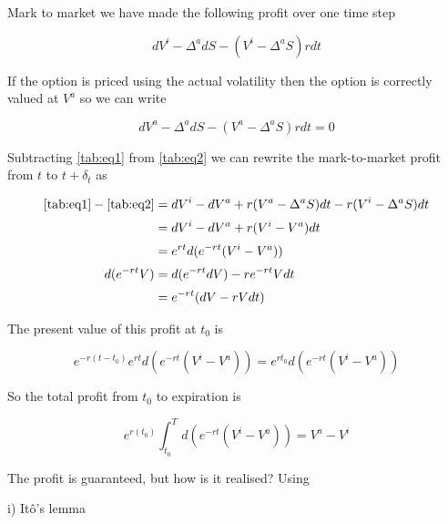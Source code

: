 \documentclass{article}
\newcommand{\para}{\vspace{8pt}} %
\begin{document}
Mark to market we have made the following profit over one time step

\begin{center}
\begin{equation}
    dV^i - \Delta^a dS -(V^i - \Delta^a S) rdt
    \label{tab:eq1}
\end{equation}
\end{center}
If the option is priced using the actual volatility then the option is correctly valued at $V^a$ so we can write
\begin{center}
\begin{equation}
    dV^a - \Delta^a dS -(V^a - \Delta^a S) rdt = 0 
    \label{tab:eq2}
\end{equation}
\end{center}
Subtracting \ref{tab:eq1} from \ref{tab:eq2} we can rewrite the mark-to-market profit from $t$ to $t + \delta_t$ as

\begin{center}
\begin{align*}
    \ref{tab:eq1} - \ref{tab:eq2} & = dV^i - dV^a + r(V^a - \Delta^a S) dt - r (V^i - \Delta^a S) dt \\[2pt]
                                  & = dV^i - dV^a + r(V^i - V^a) dt \\[2pt]
                                  & = e^{rt} d(e^{-rt} (V^i - V^a)) \\[2pt]
    d(e^{-rt}V)                   & = d(e^{-rt} dV) -r e^{-rt} V dt \\[2pt]
                                  & = e^{-rt} (dV -rV dt) \\
\end{align*}
\end{center}


The present value of this profit at $t_0$ is

\[
    e^{-r(t-t_0)} e^{rt} d(e^{-rt} (V^i - V^a)) = e^{rt_0} d(e^{-rt} (V^i - V^a))
\]

So the total profit from $t_0$ to expiration is

\begin{center}
\begin{equation}
    e^{r(t_0)} \int_{t_0}^{T} d(e^{-rt} (V^i - V^a)) = V^a - V^i
\end{equation}
\end{center}


The profit is guaranteed, but how is it realised? Using
\para

i) It\^{o}'s lemma 
\end{document}
